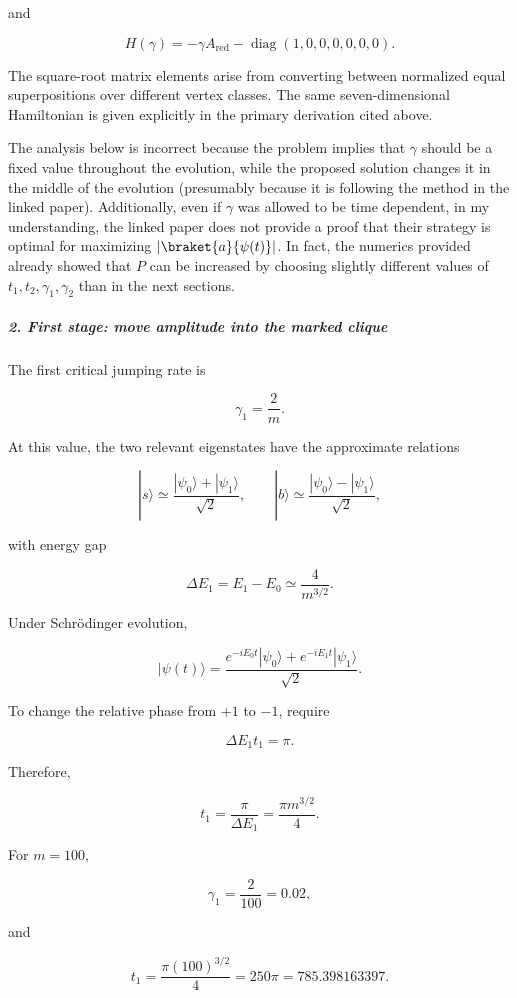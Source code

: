 and

\[
H(\gamma)=-\gamma A_{\mathrm{red}} -\operatorname{diag}(1,0,0,0,0,0,0).
\]

The square-root matrix elements arise from converting between normalized equal superpositions over different vertex classes. The same seven-dimensional Hamiltonian is given explicitly in the primary derivation cited above.

{\color{blue}
	The analysis below is incorrect because the problem implies that $\gamma$ should be a fixed value throughout the evolution, while the proposed solution changes it in the middle of the evolution (presumably because it is following the method in the linked paper). Additionally, even if $\gamma$ was allowed to be time dependent, in my understanding, the linked paper does not provide a proof that their strategy is optimal for maximizing $|\braket{a}{\psi(t)}|$. In fact, the numerics provided already showed that $P$ can be increased by choosing slightly different values of $t_1, t_2, \gamma_1, \gamma_2$ than in the next sections.
	
	
}

\subparagraph*{2. First stage: move amplitude into the marked clique}

The first critical jumping rate is

\[
\gamma_1=\frac{2}{m}.
\]

At this value, the two relevant eigenstates have the approximate relations

\[
|s\rangle\simeq \frac{|\psi_0\rangle+|\psi_1\rangle}{\sqrt2}, \qquad |b\rangle\simeq \frac{|\psi_0\rangle-|\psi_1\rangle}{\sqrt2},
\]

with energy gap

\[
\Delta E_1=E_1-E_0\simeq\frac{4}{m^{3/2}}.
\]

Under Schrödinger evolution,

\[
|\psi(t)\rangle = \frac{e^{-iE_0t}|\psi_0\rangle+ e^{-iE_1t}|\psi_1\rangle}{\sqrt2}.
\]

To change the relative phase from $+1$ to $-1$, require

\[
\Delta E_1t_1=\pi.
\]

Therefore,

\[
t_1=\frac{\pi}{\Delta E_1} =\frac{\pi m^{3/2}}{4}.
\]

For $m=100$,

\[
\gamma_1=\frac{2}{100}=0.02,
\]

and

\[
t_1=\frac{\pi(100)^{3/2}}{4} =250\pi =785.398163397.
\]

